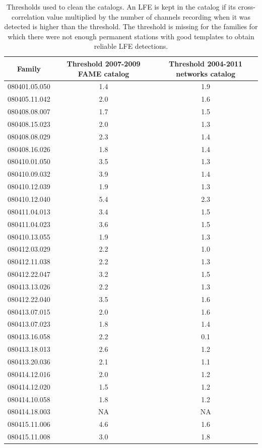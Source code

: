 \documentclass[draft]{agujournal2019}
\begin{document}
\begin{table}[hbt!]
\caption{Thresholds used to clean the catalogs. An LFE is kept in the catalog if its cross-correlation value multiplied by the number of channels recording when it was detected is higher than the threshold. The threshold is missing for the families for which there were not enough permanent stations with good templates to obtain reliable LFE detections.}
\centering
\scriptsize
\begin{tabular}{c c c}
\hline
Family & Threshold 2007-2009 FAME catalog & Threshold 2004-2011 networks catalog\\
\hline
080401.05.050 & 1.4 & 1.9 \\
080405.11.042 & 2.0 & 1.6 \\
080408.08.007 & 1.7 & 1.5 \\
080408.15.023 & 2.0 & 1.3 \\
080408.08.029 & 2.3 & 1.4 \\
080408.16.026 & 1.8 & 1.4 \\
080410.01.050 & 3.5 & 1.3 \\
080410.09.032 & 3.9 & 1.4 \\
080410.12.039 & 1.9 & 1.3 \\
080410.12.040 & 5.4 & 2.3 \\
080411.04.013 & 3.4 & 1.5 \\
080411.04.023 & 3.6 & 1.5 \\
080410.13.055 & 1.9 & 1.3 \\
080412.03.029 & 2.2 & 1.0 \\
080412.11.038 & 2.2 & 1.3 \\
080412.22.047 & 3.2 & 1.5 \\
080413.13.026 & 2.2 & 1.3 \\
080412.22.040 & 3.5 & 1.6 \\
080413.07.015 & 2.0 & 1.6 \\
080413.07.023 & 1.8 & 1.4 \\
080413.16.058 & 2.2 & 0.1 \\
080413.18.013 & 2.6 & 1.2 \\
080413.20.036 & 2.1 & 1.1 \\
080414.12.016 & 2.0 & 1.2 \\
080414.12.020 & 1.5 & 1.2 \\
080414.10.058 & 1.8 & 1.2 \\
080414.18.003 & NA & NA \\
080415.11.006 & 4.6 & 1.6 \\
080415.11.008 & 3.0 & 1.8 \\

\end{tabular}
\end{table}
\end{document}
